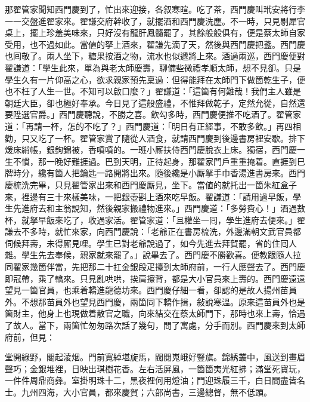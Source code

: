 那翟管家聞知西門慶到了，忙出來迎接，各叙寒暄。吃了茶，西門慶叫玳安將行李一一交盤進翟家來。翟謙交府幹收了，就擺酒和西門慶洗塵。不一時，只見剔犀官桌上，擺上珍羞美味來，只好沒有龍肝鳳髓罷了，其餘般般俱有，便是蔡太師自家受用，也不過如此。當値的拏上酒來，翟謙先滴了天，然後與西門慶把盞。西門慶也囘敬了。兩人坐下，糖果按酒之物，流水也似遞將上來。酒過兩巡，西門慶便對翟謙道：「學生此來，單為與老太師慶壽，聊備些微禮孝順太師，想不見卻。只是學生久有一片仰高之心，欲求親家預先稟過：但得能拜在太師門下做箇乾生子，便也不枉了人生一世。{}不知可以啟口麼？」翟謙道：「這箇有何難哉！我們主人雖是朝廷大臣，卻也極好奉承。今日見了這般盛禮，不惟拜做乾子，定然允從，自然還要陞選官爵。」{}西門慶聽說，不勝之喜。飲勾多時，西門慶便推不吃酒了。翟管家道：「再請一杯，怎的不吃了？」西門慶道：「明日有正經事，不敢多飲。」再四相勸，只又吃了一杯。翟管家賞了隨從人酒食，就請西門慶到後邊書房裡安歇。排下煖床綃帳，銀鉤錦被，香噴噴的。一班小厮扶侍西門慶脫衣上床。獨宿，西門慶一生不慣，那一晚好難捱過。巴到天明，正待起身，那翟家門戶重重掩着。直捱到巳牌時分，纔有箇人把鑰匙一路開將出來。隨後纔是小厮拏手巾香湯進書房來。西門慶梳洗完畢，只見翟管家出來和西門慶厮見，坐下。當値的就托出一箇朱紅盒子來，裡邊有三十來樣美味，一把銀壺斟上酒來吃早飯。翟謙道：「請用過早飯，學生先進府去和主翁說知，然後親家搬禮物進來。」西門慶道：「多勞費心！」酒過數杯，就拏早飯來吃了，收過家活。翟管家道：「且權坐一囘，學生進府去便來。」翟謙去不多時，就忙來家，{}向西門慶說：「老爺正在書房梳洗，外邊滿朝文武官員都伺候拜壽，未得厮見哩。學生已對老爺說過了，如今先進去拜賀罷，省的住囘人雜。學生先去奉候，親家就來罷了。」說畢去了。西門慶不勝歡喜。便教跟隨人拉同翟家幾箇伴當，先把那二十扛金銀段疋擡到太師府前，一行人應聲去了。西門慶即冠帶，乘了轎來。只見亂哄哄，挨肩擦背，都是大小官員來上壽的。西門慶遠遠望見一箇官員，也乘着轎進龍德坊來。西門慶仔細一看，卻認的是故人揚州苗員外。不想那苗員外也望見西門慶，兩箇同下轎作揖，敍說寒溫。原來這苗員外也是箇財主，他身上也現做着散官之職，向來結交在蔡太師門下，那時也來上壽，恰遇了故人。當下，兩箇忙匆匆路次話了幾句，問了寓處，分手而別。{}西門慶來到太師府前，但見：

\begin{myquote}
堂開綠野，閣起淩烟。門前寬綽堪旋馬，閥閱嵬峨好豎旗。錦綉叢中，風送到畫眉聲巧；金銀堆裡，日映出琪樹花香。左右活屏風，一箇箇夷光紅拂；滿堂死寶玩，一件件周鼎商彝。室掛明珠十二，黑夜裡何用燈油；門迎珠履三千，白日間盡皆名士。九州四海，大小官員，都來慶賀；六部尚書，三邊總督，無不低頭。
\end{myquote}

